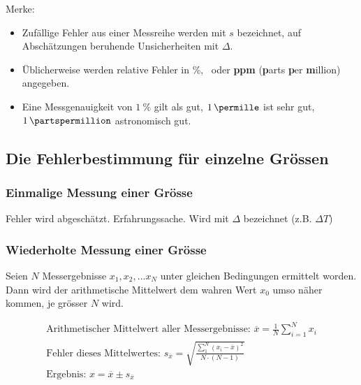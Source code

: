 Merke:

\begin{itemize}
    \item
        Zuf\"allige Fehler aus einer Messreihe  werden mit $s$ bezeichnet, auf
        Absch\"atzungen beruhende Unsicherheiten mit $\Delta$.
    \item
        \"Ublicherweise  werden  relative  Fehler  in  \%,  \perthousand~oder
        \textbf{ppm} (\textbf{p}arts \textbf{p}er \textbf{m}illion) angegeben.
    \item
        Eine   Messgenauigkeit   von    $\SI{1}{\percent}$   gilt   als   gut,
        $\SI{1}{\permille}$    ist   sehr    gut,   $\SI{1}{\partspermillion}$
        astronomisch gut.
\end{itemize}


\subsection{Die Fehlerbestimmung f\"ur einzelne Gr\"ossen}

\subsubsection{Einmalige Messung einer Gr\"osse}

Fehler  wird  abgesch\"atzt. Erfahrungssache. Wird   mit  $\Delta$  bezeichnet
(z.B. $\Delta T$)

\subsubsection{Wiederholte Messung einer Gr\"osse}

Seien  $N$  Messergebnisse $x_1,  x_2,  ...  x_N$ unter  gleichen  Bedingungen
ermittelt worden. Dann wird der arithmetische Mittelwert dem wahren Wert $x_0$
umso n\"aher kommen, je gr\"osser $N$ wird.

\begin{gather*}
    \text{Arithmetischer Mittelwert aller Messergebnisse: } \overline{x} = \frac{1}{N} \sum_{i=1}^{N}{x_i} \\
    \text{Fehler dieses Mittelwertes: } s_{\overline{x}} = \sqrt{ \frac{\sum_{1}^{N}{(x_i-\overline{x})^2}}{N \cdot (N-1)}} \\
    \text{Ergebnis: } x = \overline{x} \pm s_{\overline{x}}
\end{gather*}

